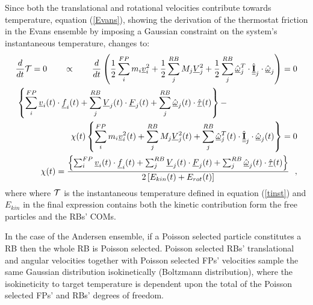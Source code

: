 Since both the translational and rotational velocities contribute towards temperature,
equation (\ref{Evans}), showing the derivation of the thermostat friction in the Evans
ensemble by imposing a Gaussian constraint on the system's instantaneous temperature,
changes to:
\begin{eqnarray}
\frac{d}{dt} {\cal T} = 0 ~~~~~~\propto~~~~~~ \frac{d}{dt} \left( \frac{1}{2} \sum_{i}^{FP} m_{i} \mbox{$\underline{v}$}_{i}^{2} + \frac{1}{2} \sum_{j}^{RB} M_{j} \mbox{$\underline{V}$}_{j}^{2} +
\frac{1}{2} \sum_{j}^{RB} \hat{\mbox{$\underline{\omega}$}}_{j}^{T} \cdot \hat{\mbox{$\underline{\underline{\bf I}}$}}_{j} \cdot \hat{\mbox{$\underline{\omega}$}}_{j} \right) = 0 \nonumber \\
\left\{ \sum_{i}^{FP} \mbox{$\underline{v}$}_{i}(t) \cdot \mbox{$\underline{f}$}_{i}(t) + \sum_{j}^{RB} \mbox{$\underline{V}$}_{j}(t) \cdot \mbox{$\underline{F}$}_{j}(t) +
\sum_{j}^{RB} \hat{\mbox{$\underline{\omega}$}}_{j}(t) \cdot \hat{\mbox{$\underline{\tau}$}}(t) \right\} - ~~~~~~~~~~~~~~~~~~~~~~~~~  \nonumber \\
~~~~~~~~~~~~~~~~~~~\chi (t) \left\{ \sum_{i}^{FP} m_{i} \mbox{$\underline{v}$}_{i}^{2}(t) +
\sum_{j}^{RB} M_{j} \mbox{$\underline{V}$}_{j}^{2}(t) + \sum_{j}^{RB} \hat{\mbox{$\underline{\omega}$}}_{j}^{T}(t) \cdot \hat{\mbox{$\underline{\underline{\bf I}}$}}_{j} \cdot \hat{\mbox{$\underline{\omega}$}}_{j}(t) \right\} = 0 \\
\chi (t) = \frac {\left\{ \sum_{i}^{FP} \mbox{$\underline{v}$}_{i}(t) \cdot \mbox{$\underline{f}$}_{i}(t) + \sum_{j}^{RB} \mbox{$\underline{V}$}_{j}(t) \cdot \mbox{$\underline{F}$}_{j}(t) +
\sum_{j}^{RB} \hat{\mbox{$\underline{\omega}$}}_{j}(t) \cdot \hat{\mbox{$\underline{\tau}$}}(t) \right\}} {2\left[ E_{kin}(t) + E_{rot}(t) \right]}~~, \nonumber
\end{eqnarray}
where where $\cal T$ is the instantaneous temperature defined in equation
(\ref {tinst}) and $E_{kin}$ in the final expression contains both the kinetic
contribution form the free particles and the RBs' COMs.

In the case of the Andersen ensemble, if a Poisson selected particle constitutes a
RB then the whole RB is Poisson selected.  Poisson selected RBs' translational and
angular velocities together with Poisson selected FPs' velocities sample the same
Gaussian distribution isokinetically (Boltzmann distribution), where the
isokineticity to target temperature is dependent upon the total of the Poisson
selected FPs' and RBs' degrees of freedom.
